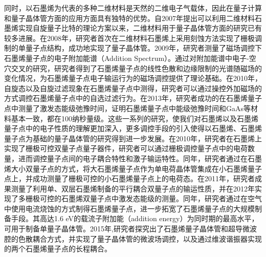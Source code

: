     同时，以石墨烯为代表的多种二维材料是天然的二维电子气载体，因此在量子计算和量子晶体管方面的应用方面具有独特的优势。自2007年提出可以利用二维材料石墨烯实现自旋量子比特的理论方案以来，二维材料用于量子晶体管方面的研究已有较多进展。在2008年，研究者首次在二维材料石墨烯上采用刻蚀方法实现了栅极调制的单量子点结构，成功地实现了量子晶体管。2009年，研究者测量了磁场调控下石墨烯量子点的电子附加能谱（Addition Spectrum）。通过对附加能谱中电子-空穴交叉的研究，研究者得到了石墨烯量子点的线性色散和边缘限制的光谱随磁场的变化情况，为石墨烯量子点电子输运行为的磁场调控提供了理论基础。在2010年，自旋态以及自旋过滤现象在石墨烯量子点中测得，研究者可以通过操控外加磁场的方式调控石墨烯量子点中的自选过滤行为。在2013年，研究者成功的在石墨烯量子点中测量了激发态能级弛豫时间，证明石墨烯量子点中能级弛豫时间和GaAs等材料基本一致，都在100纳秒量级。这些一系列的研究，使我们对石墨烯以及石墨烯量子点中的电子性质的理解更加深入，更多调控手段的引入使得以石墨烯、石墨烯量子点为基础的量子晶体管的研究得到进一步发展。在2010年，研究者在石墨烯上实现了栅极可控双量子点量子器件，研究者可以通过栅极调控量子点中的电荷数量，进而调控量子点间的电子耦合特性和激子输运特性。同年，研究者通过在石墨烯大小双量子点的方式，将大石墨烯量子点作为单电荷晶体管集成在小石墨烯量子点上，并成功测量了栅极可控的小石墨烯量子点上的电荷态。在2011年，研究者成果测量了利用单、双层石墨烯制备的平行耦合双量子点的输运性质，并在2012年实现了多栅极可控的石墨烯双量子点中激发态能级的测量。同年，研究者通过在空气中使用电流烧蚀的方式制得石墨烯量子点，进一步拓宽了石墨烯量子点的大规模制备手段。其高达1.6 eV的载流子附加能（addition energy）为同时期的最高水平，可用于制备单量子晶体管。2015年,研究者探究出了石墨烯量子晶体管和超导微波腔的色散耦合方式，并实现了量子晶体管的微波场调控，以及通过维波谐振器实现的两个石墨烯量子点的长程耦合。

